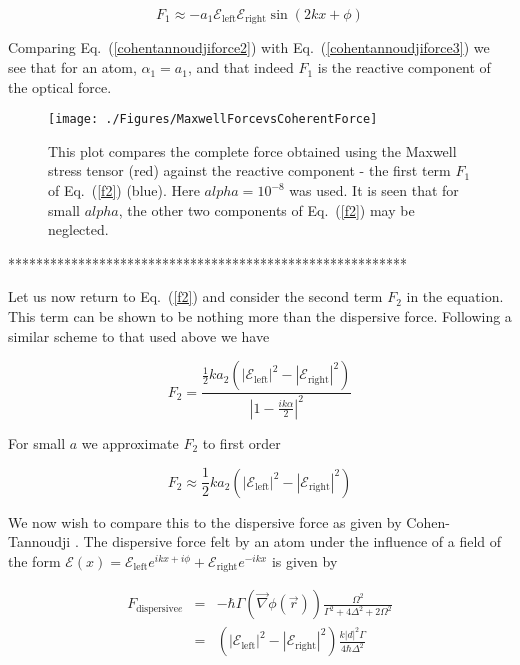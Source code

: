 \begin{equation}
F_{1}\approx-a_{1} \mathcal{E}_{\mathrm{left}}\mathcal{E}_{\mathrm{right}}\sin\left(2kx+\phi\right)
\label{cohentannoudjiforce3}
\end{equation}

Comparing Eq.\ (\ref{cohentannoudjiforce2}) with Eq.\ (\ref{cohentannoudjiforce3}) we see that for an atom, $\alpha_{1}=a_{1}$, and that indeed $F_{1}$ is the reactive component of the optical force. 

\begin{figure}
\texttt{[image: ./Figures/MaxwellForcevsCoherentForce]}
\caption{This plot compares the complete force obtained using the Maxwell stress tensor (red) against the reactive component - the first term $F_{1}$ of Eq.\ (\ref{f2}) (blue).  Here $alpha=10^{-8}$ was used.  It is seen that for small $alpha$, the other two components of Eq.\ (\ref{f2}) may be neglected.}
\label{fig:forcecompare}
\end{figure}
*********************************************************

 Let us now return to Eq.\ (\ref{f2}) and consider the second term $F_{2}$ in the equation.  This term can be shown to be nothing more than the dispersive force.  Following a similar scheme to that used above we have 


\begin{equation}
F_{2}=\frac{\frac{1}{2}ka_{2}\left(\left|\mathcal{E}_{\mathrm{left}}\right|^{2}-\left|\mathcal{E}_{\mathrm{right}}\right|^{2}\right)}{\left|1-\frac{ik\alpha}{2}\right|^{2}}
\label{secondforce1}
\end{equation}

For small $a$ we approximate $F_{2}$ to first order

\begin{equation}
F_{2}\approx\frac{1}{2}ka_{2}\left(\left|\mathcal{E}_{\mathrm{left}}\right|^{2}-\left|\mathcal{E}_{\mathrm{right}}\right|^{2}\right)
\label{secondforce2}
\end{equation}

We now wish to compare this to the dispersive force as given by Cohen-Tannoudji \cite{cohentannoudji}. The dispersive force felt by an atom under the influence of a field
of the form $\mathcal{E}(x)=\mathcal{E}_{\mathrm{left}}e^{ikx+i\phi}+\mathcal{E}_{\mathrm{right}}e^{-ikx}$ is given by

\begin{eqnarray}
F_{\mathrm{dispersive}e}&=&-\hbar\Gamma\left(\overrightarrow{\nabla}\phi(\overrightarrow{r})\right)\frac{\Omega^{2}}{\Gamma^{2}+4\Delta^{2}+2\Omega^{2}} \nonumber \\
&=&\left(\left|\mathcal{E}_{\mathrm{left}}\right|^{2}-\left|\mathcal{E}_{\mathrm{right}}\right|^{2}\right)\frac{k\left|d\right|^{2}\Gamma}{4\hbar\Delta^{2}}
\label{dispersive1}
\end{eqnarray}

